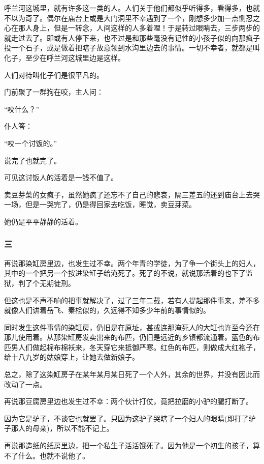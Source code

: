 \par 呼兰河这城里，就有许多这一类的人。人们关于他们都似乎听得多，看得多，也就不以为奇了。偶尔在庙台上或是大门洞里不幸遇到了一个，刚想多少加一点恻忍之心在那人身上，但是一转念，人间这样的人多着哩！于是转过眼睛去，三步两步的就走过去了。即或有人停下来，也不过是和那些毫没有记性的小孩子似的向那疯子投一个石子，或是做着把瞎子故意领到水沟里边去的事情。一切不幸者，就都是叫化子，至少在呼兰河这城里边是这样。
\par 人们对待叫化子们是很平凡的。
\par 门前聚了一群狗在咬，主人问：
\par “咬什么？”
\par 仆人答：
\par “咬一个讨饭的。”
\par 说完了也就完了。
\par 可见这讨饭人的活着是一钱不值了。
\par 卖豆芽菜的女疯子，虽然她疯了还忘不了自己的悲哀，隔三差五的还到庙台上去哭一场，但是一哭完了，仍是得回家去吃饭，睡觉，卖豆芽菜。
\par 她仍是平平静静的活着。
\subsubsection*{三}
\par 再说那染缸房里边，也发生过不幸。两个年青的学徒，为了争一个街头上的妇人，其中的一个把另一个按进染缸子给淹死了。死了的不说，就说那活着的也下了监狱，判了个无期徒刑。
\par 但这也是不声不响的把事就解决了，过了三年二载，若有人提起那件事来，差不多就像人们讲着岳飞、秦桧似的，久远得不知多少年前的事情似的。
\par 同时发生这件事情的染缸房，仍旧是在原址，甚或连那淹死人的大缸也许至今还在那儿使用着。从那染缸房发卖出来的布匹，仍旧是远近的乡镇都流通着。蓝色的布匹男人们做起棉布棉袄来，冬天穿它来抵御严寒。红色的布匹，则做成大红袍子，给十八九岁的姑娘穿上，让她去做新娘子。
\par 总之，除了这染缸房子在某年某月某日死了一个人外，其余的世界，并没有因此而改动了一点。
\par 再说那豆腐房里边也发生过不幸：两个伙计打仗，竟把拉磨的小驴的腿打断了。
\par 因为它是驴子，不谈它也就罢了。只因为这驴子哭瞎了一个妇人的眼睛(即打了驴子那人的母亲)，所以不能不记上。
\par 再说那造纸的纸房里边，把一个私生子活活饿死了。因为他是一个初生的孩子，算不了什么。也就不说他了。
